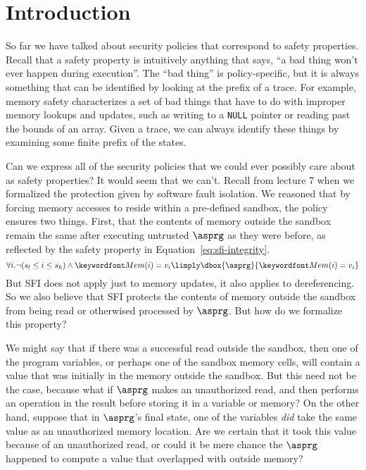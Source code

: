 \documentclass[11pt,twoside]{scrartcl}
\begin{document}
\newcommand{\atrace}{\sigma}%
\newcommand{\stdI}{\dTLint[state=\omega]}%
\newcommand{\Ip}{\dTLint[trace=\atrace]}%
\newcommand{\ws}{\omega}\newcommand{\wt}{\nu}%

\maketitle
\thispagestyle{empty}


\section{Introduction}

So far we have talked about security policies that correspond to safety properties. Recall that a safety property is intuitively anything that says, ``a bad thing won't ever happen during execution''. The ``bad thing'' is policy-specific, but it is always something that can be identified by looking at the prefix of a trace. For example, memory safety characterizes a set of bad things that have to do with improper memory lookups and updates, such as writing to a \verb'NULL' pointer or reading past the bounds of an array. Given a trace, we can always identify these things by examining some finite prefix of the states.

Can we express all of the security policies that we could ever possibly care about as safety properties? It would seem that we can't. Recall from lecture 7 when we formalized the protection given by software fault isolation. We reasoned that by forcing memory accesses to reside within a pre-defined sandbox, the policy ensures two things. First, that the contents of memory outside the sandbox remain the same after executing untrusted $\asprg$ as they were before, as reflected by the safety property in Equation~\ref{eq:sfi-integrity}.
\begin{equation}
\label{eq:sfi-integrity}
\forall i . \lnot(s_l \le i \le s_h)  \land \pderef{i}=v_i \limply \dbox{\asprg}{\pderef{i}=v_i}
\end{equation}
But SFI does not apply just to memory updates, it also applies to dereferencing. So we also believe that SFI protects the contents of memory outside the sandbox from being read or otherwised processed by $\asprg$. But how do we formalize this property? 

We might say that if there was a successful read outside the sandbox, then one of the program variables, or perhaps one of the sandbox memory cells, will contain a value that was initially in the memory outside the sandbox. But this need not be the case, because what if $\asprg$ makes an unauthorized read, and then performs an operation in the result before storing it in a variable or memory? On the other hand, suppose that in $\asprg$'s final state, one of the variables \emph{did} take the same value as an unauthorized memory location. Are we certain that it took this value because of an unauthorized read, or could it be mere chance the $\asprg$ happened to compute a value that overlapped with outside memory?
\end{document}
